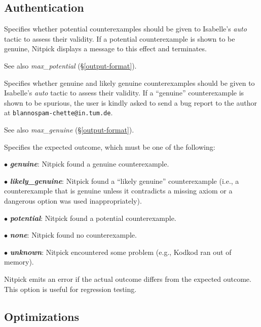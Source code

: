 \documentclass[a4paper,12pt]{article}
\begin{document}
\subsection{Authentication}
\label{authentication}

\begin{enum}
Specifies whether potential counterexamples should be given to Isabelle's
\textit{auto} tactic to assess their validity. If a potential counterexample is
shown to be genuine, Nitpick displays a message to this effect and terminates.

\nopagebreak
{\small See also \textit{max\_potential} (\S\ref{output-format}).}

Specifies whether genuine and likely genuine counterexamples should be given to
Isabelle's \textit{auto} tactic to assess their validity. If a ``genuine''
counterexample is shown to be spurious, the user is kindly asked to send a bug
report to the author at
\texttt{blan{\color{white}nospam}\kern-\wd\boxA{}chette@in.tum.de}.

\nopagebreak
{\small See also \textit{max\_genuine} (\S\ref{output-format}).}

Specifies the expected outcome, which must be one of the following:

\begin{enum}
\item[$\bullet$] \textbf{\textit{genuine}}: Nitpick found a genuine counterexample.
\item[$\bullet$] \textbf{\textit{likely\_genuine}}: Nitpick found a ``likely
genuine'' counterexample (i.e., a counterexample that is genuine unless
it contradicts a missing axiom or a dangerous option was used inappropriately).
\item[$\bullet$] \textbf{\textit{potential}}: Nitpick found a potential counterexample.
\item[$\bullet$] \textbf{\textit{none}}: Nitpick found no counterexample.
\item[$\bullet$] \textbf{\textit{unknown}}: Nitpick encountered some problem (e.g.,
Kodkod ran out of memory).
\end{enum}

Nitpick emits an error if the actual outcome differs from the expected outcome.
This option is useful for regression testing.
\end{enum}

\subsection{Optimizations}
\label{optimizations}
\end{document}
